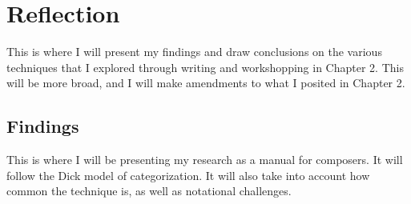 \chapter{Reflection}
This is where I will present my findings and draw conclusions on the various techniques that I explored through writing and workshopping in Chapter 2. This will be more broad, and I will make amendments to what I posited in Chapter 2. \lipsum[4]

\lipsum[4]

\section{Findings}
This is where I will be presenting my research as a manual for composers. It will follow the Dick model of categorization.\autocite{dickOtherFlute1989} It will also take into account how common the technique is, as well as notational challenges. \lipsum[5]

\lipsum[4]

\lipsum[4]

\lipsum[4]